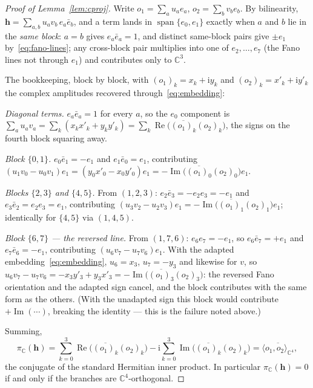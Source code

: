 \begin{proof}[Proof of Lemma~\ref{lem:cproj}]
Write $o_1 = \sum_a u_ae_a$, $o_2 = \sum_b v_be_b$. By bilinearity,
$\mathbf{h} = \sum_{a,b}u_av_b\,e_a\bar e_b$, and a term lands in
$\operatorname{span}\{e_0,e_1\}$ exactly when $a$ and $b$ lie in the \emph{same block}: $a=b$ gives
$e_a\bar e_a = 1$, and distinct same-block pairs give $\pm e_1$ by~\eqref{eq:fano-lines}; any
cross-block pair multiplies into one of $e_2,\dots,e_7$ (the Fano lines not through $e_1$) and
contributes only to $\mathbb{C}^3$.

The bookkeeping, block by block, with $(o_1)_k = x_k+\mathrm{i}y_k$ and $(o_2)_k = x'_k+\mathrm{i}y'_k$
the complex amplitudes recovered through~\eqref{eq:embedding}:

\emph{Diagonal terms.} $e_a\bar e_a = 1$ for every $a$, so the $e_0$ component is
$\sum_a u_av_a = \sum_k (x_kx'_k + y_ky'_k) = \sum_k\operatorname{Re}\bigl(\overline{(o_1)_k}(o_2)_k\bigr)$,
the signs on the fourth block squaring away.

\emph{Block $\{0,1\}$.} $e_0\bar e_1 = -e_1$ and $e_1\bar e_0 = e_1$, contributing
$(u_1v_0 - u_0v_1)e_1 = (y_0x'_0 - x_0y'_0)e_1
= -\operatorname{Im}\bigl(\overline{(o_1)_0}(o_2)_0\bigr)e_1$.

\emph{Blocks $\{2,3\}$ and $\{4,5\}$.} From $(1,2,3)$: $e_2\bar e_3 = -e_2e_3 = -e_1$ and
$e_3\bar e_2 = e_2e_3 = e_1$, contributing $(u_3v_2-u_2v_3)e_1 =
-\operatorname{Im}\bigl(\overline{(o_1)_1}(o_2)_1\bigr)e_1$; identically for $\{4,5\}$ via $(1,4,5)$.

\emph{Block $\{6,7\}$ --- the reversed line.} From $(1,7,6)$: $e_6e_7 = -e_1$, so
$e_6\bar e_7 = +e_1$ and $e_7\bar e_6 = -e_1$, contributing $(u_6v_7 - u_7v_6)e_1$. With the adapted
embedding~\eqref{eq:embedding}, $u_6 = x_3$, $u_7 = -y_3$ and likewise for $v$, so
$u_6v_7 - u_7v_6 = -x_3y'_3 + y_3x'_3 = -\operatorname{Im}\bigl(\overline{(o_1)_3}(o_2)_3\bigr)$:
the reversed Fano orientation and the adapted sign cancel, and the block contributes with the same
form as the others. (With the unadapted sign this block would contribute
$+\operatorname{Im}(\cdots)$, breaking the identity --- this is the failure noted above.)

Summing,
\begin{equation}
  \pi_{\mathbb{C}}(\mathbf{h})
  = \sum_{k=0}^{3}\operatorname{Re}\bigl(\overline{(o_1)_k}(o_2)_k\bigr)
  - \mathrm{i}\sum_{k=0}^{3}\operatorname{Im}\bigl(\overline{(o_1)_k}(o_2)_k\bigr)
  = \overline{\langle o_1,o_2\rangle_{\mathbb{C}^4}},
\end{equation}
the conjugate of the standard Hermitian inner product. In particular
$\pi_{\mathbb{C}}(\mathbf{h}) = 0$ if and only if the branches are $\mathbb{C}^4$-orthogonal.
\end{proof}

